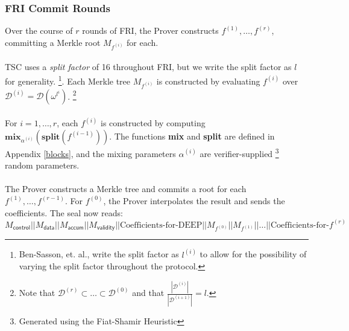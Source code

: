 \documentclass[10pt,letterpaper,titlepage]{article}
\newcommand{\w}[0]{\omega}
\newcommand{\D}[0]{\mathcal{D}}
\theoremstyle{definition}
\begin{document}
\begin{appendices}
\subsubsection*{FRI Commit Rounds}
Over the course of $r$ rounds of FRI, the Prover constructs $f^{(1)},\ldots,f^{(r)}$, committing a Merkle root $M_{f^{(i)}}$ for each. \\
\\
TSC uses a \textit{split factor} of 16 throughout FRI, but we write the split factor as $l$ for generality.%
\footnote{Ben-Sasson, et. al., write the split factor as $l^{(i)}$ to allow for the possibility of varying the split factor throughout the protocol.}.
Each Merkle tree $M_{f^{(i)}}$ is constructed by evaluating $f^{(i)}$ over $\D^{(i)}=\D(\w^{l^i})$.%
\footnote{Note that $\D^{(r)}\subset\ldots\subset\D^{(0)}$ and that $\frac{|\D^{(i)}|}{|\D^{(i+1)}|}=l$.}
\\
\\For $i=1,\ldots,r$, each $f^{(i)}$ is constructed by computing $\textbf{mix}_{\alpha^{(i)}}(\textbf{split}(f^{(i-1)}))$. 
The functions \textbf{mix} and \textbf{split} are defined in Appendix \ref{blocks}, and the mixing parameters $\alpha^{(i)}$ are verifier-supplied%
\footnote{Generated using the Fiat-Shamir Heuristic} random parameters.\\
\\
The Prover constructs a Merkle tree and commits a root for each $f^{(1)},\ldots,f^{(r-1)}$. 
For $f^{(0)}$, the Prover interpolates the result and sends the coefficients. 
The seal now reads:
\[
  M_\mathsf{control}||
  M_\mathsf{data}||
  M_\mathsf{accum}||
  M_\mathsf{validity}||
  \text{Coefficients-for-DEEP}||
  M_{f^{(0)}}||
  M_{f^{(1)}}||
  \ldots||
  \text{Coefficients-for-}f^{(r)}
\]


\end{appendices}
\end{document}
